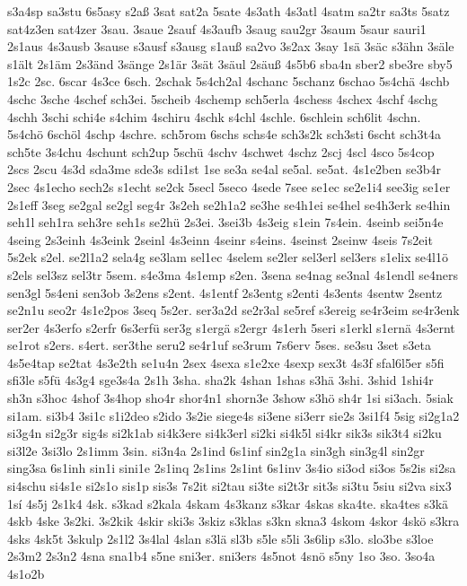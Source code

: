 {s3a4sp
sa3stu
6s5asy
s2aß
3sat
sat2a
5sate
4s3ath
4s3atl
4satm
sa2tr
sa3ts
5satz
sat4z3en
sat4zer
3sau.
3saue
2sauf
4s3aufb
3saug
sau2gr
3saum
5saur
sauri1
2s1aus
4s3ausb
3sause
s3ausf
s3ausg
s1auß
sa2vo
3s2ax
3say
1sä
3säc
s3ähn
3säle
s1ält
2s1äm
2s3änd
3sänge
2s1är
3sät
3säul
2säuß
4s5b6
sba4n
sber2
sbe3re
sby5
1s2c
2sc.
6scar
4s3ce
6sch.
2schak
5s4ch2al
4schanc
5schanz
6schao
5s4chä
4schb
4schc
3sche
4schef
sch3ei.
5scheib
4schemp
sch5erla
4schess
4schex
4schf
4schg
4schh
3schi
schi4e
s4chim
4schiru
4schk
s4chl
4schle.
6schlein
sch6lit
4schn.
5s4chö
6schöl
4schp
4schre.
sch5rom
6schs
schs4e
sch3s2k
sch3sti
6scht
sch3t4a
sch5te
3s4chu
4schunt
sch2up
5schü
4schv
4schwet
4schz
2scj
4scl
4sco
5s4cop
2scs
2scu
4s3d
sda3me
sde3s
sdi1st
1se
se3a
se4al
se5al.
se5at.
4s1e2ben
se3b4r
2sec
4s1echo
sech2s
s1echt
se2ck
5secl
5seco
4sede
7see
se1ec
se2e1i4
see3ig
se1er
2s1eff
3seg
se2gal
se2gl
seg4r
3s2eh
se2h1a2
se3he
se4h1ei
se4hel
se4h3erk
se4hin
seh1l
seh1ra
seh3re
seh1s
se2hü
2s3ei.
3sei3b
4s3eig
s1ein
7s4ein.
4seinb
sei5n4e
4seing
2s3einh
4s3eink
2seinl
4s3einn
4seinr
s4eins.
4seinst
2seinw
4seis
7s2eit
5s2ek
s2el.
se2l1a2
sela4g
se3lam
sel1ec
4selem
se2ler
sel3erl
sel3ers
s1elix
se4l1ö
s2els
sel3sz
sel3tr
5sem.
s4e3ma
4s1emp
s2en.
3sena
se4nag
se3nal
4s1endl
se4ners
sen3gl
5s4eni
sen3ob
3s2ens
s2ent.
4s1entf
2s3entg
s2enti
4s3ents
4sentw
2sentz
se2n1u
seo2r
4s1e2pos
3seq
5s2er.
ser3a2d
se2r3al
se5ref
s3ereig
se4r3eim
se4r3enk
ser2er
4s3erfo
s2erfr
6s3erfü
ser3g
s1ergä
s2ergr
4s1erh
5seri
s1erkl
s1ernä
4s3ernt
se1rot
s2ers.
s4ert.
ser3the
seru2
se4r1uf
se3rum
7s6erv
5ses.
se3su
3set
s3eta
4s5e4tap
se2tat
4s3e2th
se1u4n
2sex
4sexa
s1e2xe
4sexp
sex3t
4s3f
sfal6l5er
s5fi
sfi3le
s5fü
4s3g4
sge3s4a
2s1h
3sha.
sha2k
4shan
1shas
s3hä
3shi.
3shid
1shi4r
sh3n
s3hoc
4shof
3s4hop
sho4r
shor4n1
shorn3e
3show
s3hö
sh4r
1si
si3ach.
5siak
si1am.
si3b4
3si1c
s1i2deo
s2ido
3s2ie
siege4s
si3ene
si3err
sie2s
3si1f4
5sig
si2g1a2
si3g4n
si2g3r
sig4s
si2k1ab
si4k3ere
si4k3erl
si2ki
si4k5l
si4kr
sik3s
sik3t4
si2ku
si3l2e
3si3lo
2s1imm
3sin.
si3n4a
2s1ind
6s1inf
sin2g1a
sin3gh
sin3g4l
sin2gr
sing3sa
6s1inh
sin1i
sini1e
2s1inq
2s1ins
2s1int
6s1inv
3s4io
si3od
si3os
5s2is
si2sa
si4schu
si4s1e
si2s1o
sis1p
sis3s
7s2it
si2tau
si3te
si2t3r
sit3s
si3tu
5siu
si2va
six3
1sí
4s5j
2s1k4
4sk.
s3kad
s2kala
4skam
4s3kanz
s3kar
4skas
ska4te.
ska4tes
s3kä
4skb
4ske
3s2ki.
3s2kik
4skir
ski3s
3skiz
s3klas
s3kn
skna3
4skom
4skor
4skö
s3kra
4sks
4sk5t
3skulp
2s1l2
3s4lal
4slan
s3lä
sl3b
s5le
s5li
3s6lip
s3lo.
slo3be
s3loe
2s3m2
2s3n2
4sna
sna1b4
s5ne
sni3er.
sni3ers
4s5not
4snö
s5ny
1so
3so.
3so4a
4s1o2b
}
